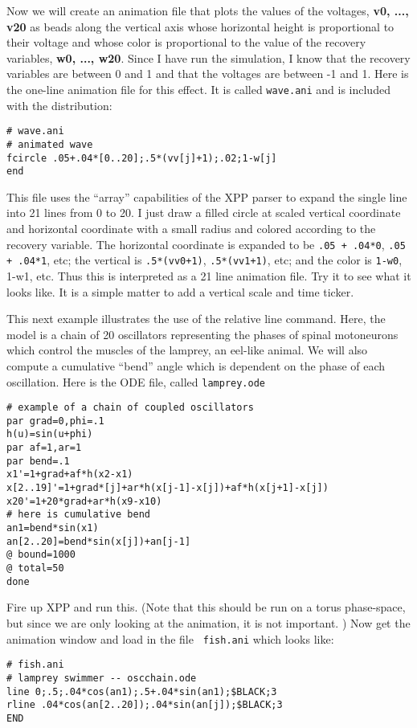 \documentclass{article}
\begin{document}
Now we will create an animation file that plots the values of the
voltages, {\bf v0, ..., v20} 
 as beads along the vertical axis whose horizontal height is
proportional to their voltage and whose color is proportional to the
value of the recovery variables, {\bf w0, ..., w20}. Since I have run
the simulation, I know that the recovery variables are between 0 and 1
and that the voltages are between -1 and 1.  Here is the one-line
animation file for this effect. It is called {\tt wave.ani} and is
included with the distribution:
\begin{verbatim}
# wave.ani
# animated wave 
fcircle .05+.04*[0..20];.5*(vv[j]+1);.02;1-w[j]
end
\end{verbatim}
This file uses the ``array'' capabilities of the XPP parser to expand
the single line into 21 lines from 0 to 20. I just draw a filled
circle at scaled vertical coordinate and horizontal coordinate with a
small radius and colored according to the recovery variable. The
horizontal coordinate is expanded to be {\tt .05 + .04*0}, {\tt .05 +
.04*1}, etc; the vertical is {\tt .5*(vv0+1)}, {\tt .5*(vv1+1)}, etc;
and the color is {\tt 1-w0}, {1-w1}, etc. Thus this is interpreted as
a 21 line animation file.  Try it to see what it looks like. It is a
simple matter to add a vertical scale and time ticker. 

\medskip

This next example illustrates the use of the relative line
command. Here, the model is a chain of 20 oscillators representing the
phases of spinal motoneurons which control the muscles of the lamprey,
an eel-like animal.  We will also compute a cumulative ``bend'' angle
which is dependent on the phase of each oscillation. Here is the ODE
file, called {\tt lamprey.ode}
\begin{verbatim}
# example of a chain of coupled oscillators
par grad=0,phi=.1
h(u)=sin(u+phi)
par af=1,ar=1
par bend=.1
x1'=1+grad+af*h(x2-x1)
x[2..19]'=1+grad*[j]+ar*h(x[j-1]-x[j])+af*h(x[j+1]-x[j])
x20'=1+20*grad+ar*h(x9-x10)
# here is cumulative bend
an1=bend*sin(x1)
an[2..20]=bend*sin(x[j])+an[j-1]
@ bound=1000
@ total=50
done
\end{verbatim}

Fire up XPP and run this. (Note that this should be run on a torus
phase-space, but since we are only looking at the animation, it is not
important. ) Now get the animation window and load in the file {\tt
fish.ani} which looks like:
\begin{verbatim}
# fish.ani
# lamprey swimmer -- oscchain.ode
line 0;.5;.04*cos(an1);.5+.04*sin(an1);$BLACK;3
rline .04*cos(an[2..20]);.04*sin(an[j]);$BLACK;3
END
\end{verbatim}
\end{document}
